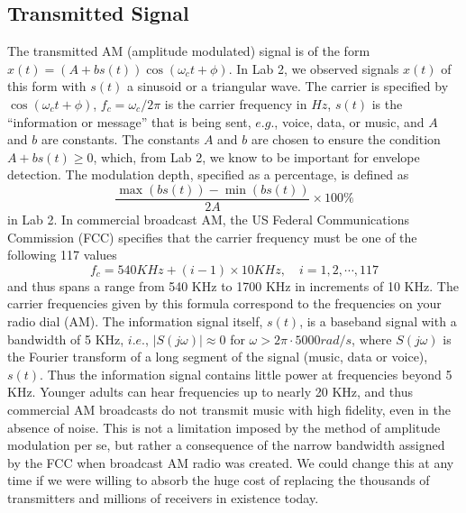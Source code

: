 \documentclass[utf8]{article}
\begin{document}
\subsection{Transmitted Signal}
{
	The transmitted AM (amplitude modulated) signal is of the form $x(t) = ( A + bs(t))\cos(\omega_ct + \phi)$. In Lab 2, we observed signals $x(t)$ of this form with $s(t)$ a sinusoid or a triangular wave. The carrier is specified by $\cos(\omega_ct + \phi)$, $f_c = \omega_c/2\pi$ is the carrier frequency in $Hz$, $s(t)$ is the “information or message” that is being sent, $e.g.$, voice, data, or music, and $A$ and $b$ are constants. The constants $A$ and $b$ are chosen to ensure the condition $A + bs(t) \ge 0$, which, from Lab 2, we know to be important for envelope detection. The modulation depth, specified as a percentage, is defined as
$$\frac{\max(bs(t))-\min(bs(t))}{2A}\times 100\%$$
in Lab 2.
In commercial broadcast AM, the US Federal Communications Commission (FCC) specifies that the carrier frequency must be one of the following 117 values
$$f_c = 540 KHz + (i-1)\times 10 KHz, \quad i = 1, 2, \cdots, 117$$
and thus spans a range from 540 KHz to 1700 KHz in increments of 10 KHz. The carrier frequencies given by this formula correspond to the frequencies on your radio dial (AM).
The information signal itself, $s(t)$, is a baseband signal with a bandwidth of 5 KHz, $i.e.$, $| S(j\omega) | \approx 0$ for $\omega > 2\pi \cdot 5000 rad/s$, where $S(j\omega)$ is the Fourier transform of a long segment of the signal (music, data or voice), $s(t)$. Thus the information signal contains little power at frequencies beyond 5 KHz. Younger adults can hear frequencies up to nearly 20 KHz, and thus commercial AM broadcasts do not transmit music with high fidelity, even in the absence of noise. This is not a limitation imposed by the method of amplitude modulation per se, but rather a consequence of the narrow bandwidth assigned by the FCC when broadcast AM radio was created. We could change this at any time if we were willing to absorb the huge cost of replacing the thousands of transmitters and millions of receivers in existence today.
}
\end{document}
